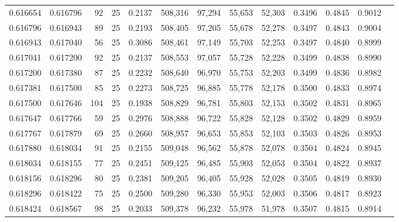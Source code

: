 \begin{tabular}{rrrrrrrrrrrrr}
0.616654 & 0.616796 &    92 &  25 &                                     0.2137 & 508,316 &  97,294 &  55,653 &  52,303 & 0.3496 & 0.4845 & 0.9012 \\
0.616796 & 0.616943 &    89 &  25 &                                     0.2193 & 508,405 &  97,205 &  55,678 &  52,278 & 0.3497 & 0.4843 & 0.9004 \\
0.616943 & 0.617040 &    56 &  25 &                                     0.3086 & 508,461 &  97,149 &  55,703 &  52,253 & 0.3497 & 0.4840 & 0.8999 \\
0.617041 & 0.617200 &    92 &  25 &                                     0.2137 & 508,553 &  97,057 &  55,728 &  52,228 & 0.3499 & 0.4838 & 0.8990 \\
0.617200 & 0.617380 &    87 &  25 &                                     0.2232 & 508,640 &  96,970 &  55,753 &  52,203 & 0.3499 & 0.4836 & 0.8982 \\
0.617381 & 0.617500 &    85 &  25 &                                     0.2273 & 508,725 &  96,885 &  55,778 &  52,178 & 0.3500 & 0.4833 & 0.8974 \\
0.617500 & 0.617646 &   104 &  25 &                                     0.1938 & 508,829 &  96,781 &  55,803 &  52,153 & 0.3502 & 0.4831 & 0.8965 \\
0.617647 & 0.617766 &    59 &  25 &                                     0.2976 & 508,888 &  96,722 &  55,828 &  52,128 & 0.3502 & 0.4829 & 0.8959 \\
0.617767 & 0.617879 &    69 &  25 &                                     0.2660 & 508,957 &  96,653 &  55,853 &  52,103 & 0.3503 & 0.4826 & 0.8953 \\
0.617880 & 0.618034 &    91 &  25 &                                     0.2155 & 509,048 &  96,562 &  55,878 &  52,078 & 0.3504 & 0.4824 & 0.8945 \\
0.618034 & 0.618155 &    77 &  25 &                                     0.2451 & 509,125 &  96,485 &  55,903 &  52,053 & 0.3504 & 0.4822 & 0.8937 \\
0.618156 & 0.618296 &    80 &  25 &                                     0.2381 & 509,205 &  96,405 &  55,928 &  52,028 & 0.3505 & 0.4819 & 0.8930 \\
0.618296 & 0.618422 &    75 &  25 &                                     0.2500 & 509,280 &  96,330 &  55,953 &  52,003 & 0.3506 & 0.4817 & 0.8923 \\
0.618424 & 0.618567 &    98 &  25 &                                     0.2033 & 509,378 &  96,232 &  55,978 &  51,978 & 0.3507 & 0.4815 & 0.8914 \\

\end{tabular}
